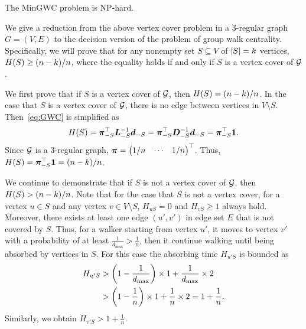 \documentclass[10pt,twocolumn,twoside]{IEEEtran}
\begin{document}
\begin{theorem}\label{thm:np-hard}
    The MinGWC problem is NP-hard.
\end{theorem}
\begin{IEEEproof}
    We give a reduction from the above vertex cover problem in a 3-regular graph  \(G=(V,E)\) to the decision version of the problem of group walk centrality. Specifically, we will prove that for any nonempty set \(S\subseteq V\) of  \(\left|S \right|=k\)  vertices, \(H(S)\ge (n-k)/n\), where the equality holds if and only if \(S\) is a vertex cover of \(\mathcal{G}\).



    We first prove that if \(S\) is a vertex cover of \(\mathcal{G}\), then \(H(S)=(n-k)/n\). In the case that \(S\) is a vertex cover of \(\mathcal{G}\), there is no edge between vertices in \(V\setminus S\). Then~\eqref{eq:GWC} is simplified as
    \begin{equation*}
        H(S)=\boldsymbol{\pi}_{-S}^\top\boldsymbol{L}_{-S}^{-1}\boldsymbol{d}_{-S}=\boldsymbol{\pi}_{-S}^\top\boldsymbol{D}_{-S}^{-1}\boldsymbol{d}_{-S}=\boldsymbol{\pi}_{-S}^\top\boldsymbol{1}.
    \end{equation*}
    Since \(\mathcal{G}\) is a 3-regular graph, \(\boldsymbol{\pi}=\begin{pmatrix}1/n&\cdots&1/n\end{pmatrix}^\top\).
    Thus, \(H(S)=\boldsymbol{\pi}_{-S}^\top\boldsymbol{1}=(n-k)/n\).

    We continue to demonstrate that if \(S\) is not a vertex cover of \(\mathcal{G}\), then \(H(S)>(n-k)/n\).  Note that for the case that \(S\) is not a vertex cover,  for a vertex \(u\in S\) and any vertex \(v\in V\setminus S\), \(H_{uS}=0\) and \(H_{vS}\ge1\) always hold. Moreover, there exists at least one edge \((u',v')\) in edge set \(E\) that is not covered by \(S\). Thus, for a walker starting from vertex \(u'\), it moves to vertex \(v'\) with a probability of at least \(\frac{1}{d_{\max}}>\frac{1}{n}\), then it continue walking until being absorbed by vertices in  \(S\).  For this case the absorbing time $H_{u'S}$ is bounded as
    \begin{align*}
        H_{u'S} & >\left( 1-\frac{1}{d_{\max}} \right)\times1+\frac{1}{d_{\max}}\times2  \\
                & >\left( 1-\frac{1}{n} \right)\times1+\frac{1}{n}\times2=1+\frac{1}{n}.
    \end{align*}
    Similarly, we obtain \(H_{v'S}>1+\frac{1}{n}\).


\end{IEEEproof}
\end{document}
